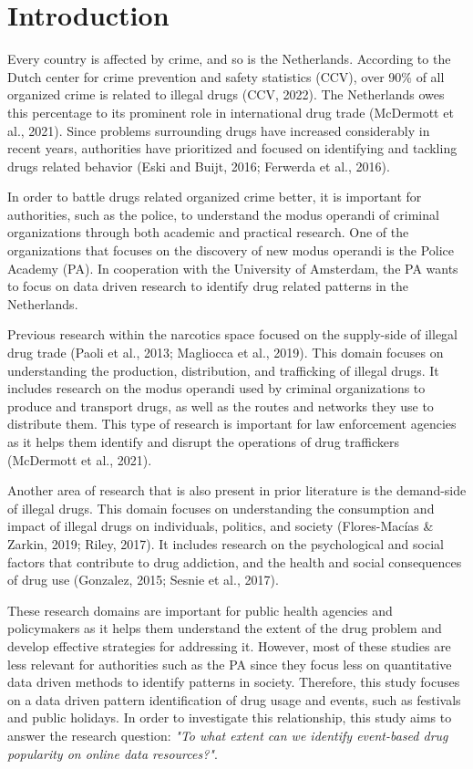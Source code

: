 \section{Introduction}

Every country is affected by crime, and so is the Netherlands. According to the Dutch center for crime prevention and safety statistics (CCV), over 90\% of all organized crime is related to illegal drugs (CCV, 2022). The Netherlands owes this percentage to its prominent role in international drug trade (McDermott et al., 2021). Since problems surrounding drugs have increased considerably in recent years, authorities have prioritized and focused on identifying and tackling drugs related behavior (Eski and Buijt, 2016; Ferwerda et al., 2016). 

In order to battle drugs related organized crime better, it is important for authorities, such as the police, to understand the modus operandi of criminal organizations through both academic and practical research. One of the organizations that focuses on the discovery of new modus operandi is the Police Academy (PA). In cooperation with the University of Amsterdam, the PA wants to focus on data driven research to identify drug related patterns in the Netherlands. 

Previous research within the narcotics space focused on the supply-side of illegal drug trade (Paoli et al., 2013; Magliocca et al., 2019). This domain focuses on understanding the production, distribution, and trafficking of illegal drugs. It includes research on the modus operandi used by criminal organizations to produce and transport drugs, as well as the routes and networks they use to distribute them. This type of research is important for law enforcement agencies as it helps them identify and disrupt the operations of drug traffickers (McDermott et al., 2021).

Another area of research that is also present in prior literature is the demand-side of illegal drugs. This domain focuses on understanding the consumption and impact of illegal drugs on individuals, politics, and society (Flores-Macías \& Zarkin, 2019; Riley, 2017). It includes research on the psychological and social factors that contribute to drug addiction, and the health and social consequences of drug use (Gonzalez, 2015; Sesnie et al., 2017). 

These research domains are important for public health agencies and policymakers as it helps them understand the extent of the drug problem and develop effective strategies for addressing it. However, most of these studies are less relevant for authorities such as the PA since they focus less on quantitative data driven methods to identify patterns in society. Therefore, this study focuses on a data driven pattern identification of drug usage and events, such as festivals and public holidays. In order to investigate this relationship, this study aims to answer the research question: \textit{"To what extent can we identify event-based drug popularity on online data resources?"}.


